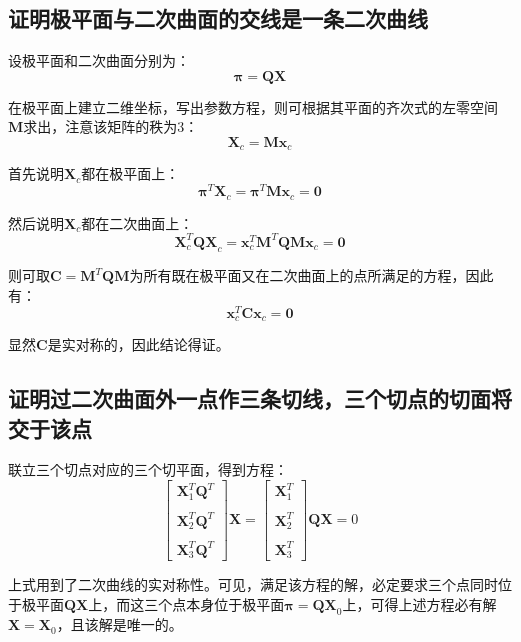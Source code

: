 \documentclass[11pt]{article}
\begin{document}
\subsection{证明极平面与二次曲面的交线是一条二次曲线}
\label{subsec:证明极平面与二次曲面的交线是一条二次曲线}
\par
设极平面和二次曲面分别为：
\begin{equation*}
  \mathbold{\pi=QX}
\end{equation*}\par
在极平面上建立二维坐标，写出参数方程，则可根据其平面的齐次式的左零空间$\mathbf{M}$求出，注意该矩阵的秩为3：
\begin{equation*}
  \mathbf{X}_c=\mathbf{Mx}_c
\end{equation*}\par
首先说明$\mathbf{X}_c$都在极平面上：
\begin{equation*}
  \mathbold{\pi}^T\mathbf{X}_c=\mathbold{\pi}^T\mathbf{Mx}_c=\mathbf{0}
\end{equation*}\par
然后说明$\mathbf{X}_c$都在二次曲面上：
\begin{equation*}
  \mathbf{X}_c^T\mathbold{QX}_c=\mathbf{x}_c^T\mathbf{M}^T\mathbold{Q}\mathbf{Mx}_c=\mathbf{0}
\end{equation*}\par
则可取$\mathbf{C=M^\mathit{T}QM}$为所有既在极平面又在二次曲面上的点所满足的方程，因此有：
\begin{equation*}
  \mathbf{x}_c^T\mathbf{C}\mathbf{x}_c=\mathbf{0}
\end{equation*}\par
显然$\mathbf{C}$是实对称的，因此结论得证。
\subsection{证明过二次曲面外一点作三条切线，三个切点的切面将交于该点}
\par
联立三个切点对应的三个切平面，得到方程：
\begin{equation*}
  \begin{bmatrix}
    \mathbf{X}_1^T \mathbf{Q}^T \\\\ \mathbf{X}_2^T \mathbf{Q}^T \\\\ \mathbf{X}_3^T \mathbf{Q}^T
  \end{bmatrix}\mathbf{X}=\begin{bmatrix}
    \mathbf{X}_1^T \\\\ \mathbf{X}_2^T\\\\ \mathbf{X}_3^T
  \end{bmatrix}\mathbf{QX}=0
\end{equation*}\par
上式用到了二次曲线的实对称性。可见，满足该方程的解，必定要求三个点同时位于极平面$\mathbf{QX}$上，而这三个点本身位于极平面$\mathbold{\pi=QX}_0$上，可得上述方程必有解$\mathbf{X=X}_0$，且该解是唯一的。
\end{document}
